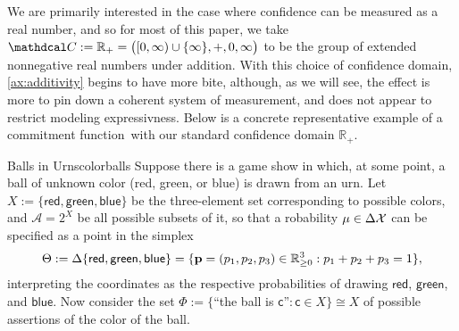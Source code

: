 \documentclass{article}
\def\cofunc{commitment function}
\def\confdom{\mathdcal C}
\begin{document}
We are primarily interested in the case where confidence can be measured as a real number, and so for most of this paper, we take $\confdom := \mathbb R_{+} = \big([0, \infty) \cup \{\infty\}, +, 0, \infty\big)$ to be the group of extended nonnegative real numbers under addition.
With this choice of confidence domain, \cref{ax:additivity} begins to have more bite, although, as we will see, the effect is more to pin down a coherent system of measurement, and does not appear to restrict modeling expressivness.
%
%
Below is a concrete representative example of a \cofunc\ with our standard confidence domain $\mathbb R_+$.
\begin{examplex}{Balls in Urns}{colorballs}
        \def\red{{\mathsf{red}}}
        \def\green{{\mathsf{green}}}
        \def\blue{{\mathsf{blue}}}
    Suppose there is a game show in which, at some point, a ball of unknown color
    (red, green, or blue) is drawn from an urn.
    Let  $X := \{ \red,\green,\blue \}$ be the three-element set corresponding to possible colors,
     and $\mathcal A = 2^X$ be all possible subsets of it, so that a robability $\mu \in \Delta \mathcal X$
    can be specified as a
    point in the simplex
    $$\Theta
    := \Delta \{ \red,\green,\blue \}
    = \{\mat p = (p_1, p_2, p_3)  \in \mathbb R^3_{\ge 0} : p_1 + p_2 + p_3 = 1\},$$
    interpreting
    the coordinates as the respective probabilities of drawing $\red$, $\green$, and $\blue$.
    Now consider the set
     $\Phi := \{$``the ball is $\mathsf c$''$ : \mathsf c \in X\} \cong X$ of possible assertions of the color of the ball.


\end{examplex}
\end{document}
